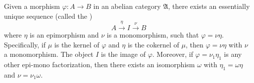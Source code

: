 Given a morphism $\varphi: A \to B$ in an abelian category $\mathfrak{A}$, there exists an essentially unique sequence (called the )
$$A \xrightarrow{\eta} I \xrightarrow{\nu} B$$
where $\eta$ is an epimorphism and $\nu$ is a monomorphism, such that $\varphi = \nu \eta$. Specifically, if $\mu$ is the kernel of $\varphi$ and $\eta$ is the cokernel of $\mu$, then $\varphi = \nu \eta$ with $\nu$ a monomorphism. The object $I$ is the image of $\varphi$. Moreover, if $\varphi = \nu_1 \eta_1$ is any other epi-mono factorization, then there exists an isomorphism $\omega$ with $\eta_1 = \omega \eta$ and $\nu = \nu_1 \omega$.
